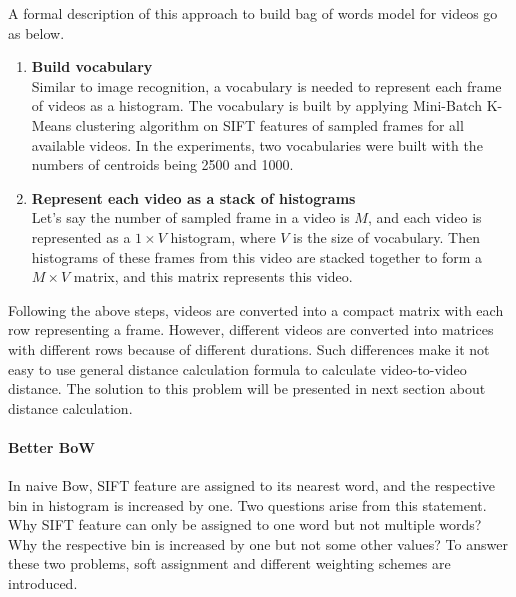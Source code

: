 	\noindent A formal description of this approach to build bag of words model for videos go as below.
	\begin{enumerate}
		\item{\bfseries Build vocabulary}\\
	    Similar to image recognition, a vocabulary is needed to represent each frame of videos as a histogram. The vocabulary is built by applying Mini-Batch K-Means \cite{sculley2010web} clustering algorithm on SIFT features of sampled frames for all available videos. In the experiments, two vocabularies were built with the numbers of centroids being 2500 and 1000.

	    \item{\bfseries Represent each video as a stack of histograms}\\
	    Let's say the number of sampled frame in a video is $M$, and each video is represented as a $1 \times V$ histogram, where $V$ is the size of vocabulary. Then histograms of these frames from this video are stacked together to form a $M \times V$ matrix, and this matrix represents this video. 
	\end{enumerate}

	\noindent Following the above steps, videos are converted into a compact matrix with each row representing a frame. However, different videos are converted into matrices with different rows because of different durations. Such differences make it not easy to use general distance calculation formula to calculate video-to-video distance. The solution to this problem will be presented in next section about distance calculation.

	\paragraph{Better BoW}
	In naive Bow, SIFT feature are assigned to its nearest word, and the respective bin in histogram is increased by one. Two questions arise from this statement. Why SIFT feature can only be assigned to one word but not multiple words? Why the respective bin is increased by one but not some other values? To answer these two problems, soft assignment and different weighting schemes are introduced. 

